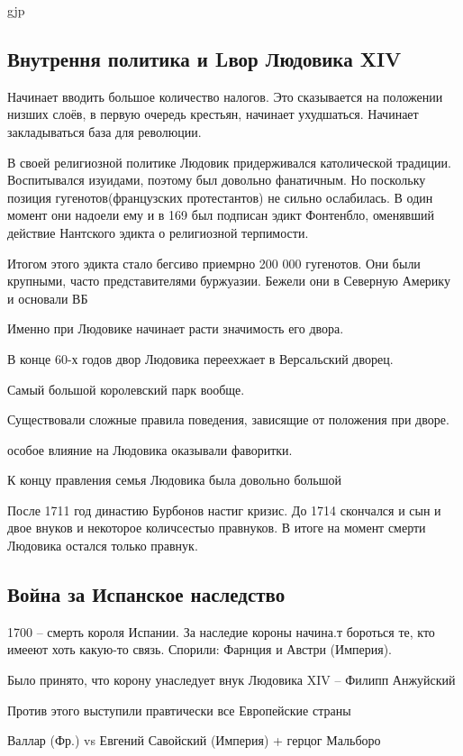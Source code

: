 gjp	 \documentclass[12pt,a4paper]{article}
\begin{document}
\subsection{Внутрення политика и Lвор Людовика XIV}

Начинает вводить большое количество налогов. Это сказывается на положении низших слоёв, в первую очередь крестьян, начинает ухудшаться. Начинает закладываться база для революции.

В своей религиозной политике Людовик придерживался католической традиции. Воспитывался изуидами, поэтому был довольно фанатичным. Но поскольку позиция гугенотов(французских протестантов) не сильно ослабилась. В один момент они надоели ему и в 169 был подписан эдикт Фонтенбло, оменявший действие Нантского эдикта о религиозной терпимости.

Итогом этого эдикта стало бегсиво приемрно 200 000 гугенотов. Они были крупными, часто представителями буржуазии. Бежели они в Северную Америку и основали ВБ

Именно при Людовике начинает расти значимость его двора.

В конце 60-х годов двор Людовика переехжает в Версальский дворец.

Самый большой королевский парк вообще.

Существовали сложные правила поведения, зависящие от положения при дворе.

особое влияние на Людовика оказывали фаворитки.

К концу правления семья Людовика была довольно большой

После 1711 год династию Бурбонов настиг кризис. До 1714 скончался и сын и двое внуков и некоторое количсестыо правнуков. В итоге на момент смерти Людовика остался только правнук. 

\subsection{Война за Испанское наследство}

1700 -- смерть короля Испании. За наследие короны начина.т бороться те, кто имееют хоть какую-то связь. Спорили: Фарнция и Австри (Империя).

Было принято, что корону унаследует внук Людовика XIV -- Филипп Анжуйский

Против этого выступили правтически все Европейские страны

Валлар (Фр.) vs Евгений Савойский (Империя) + герцог Мальборо
\end{document}
